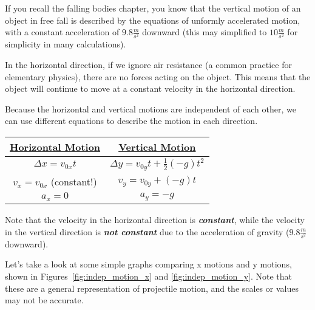 If you recall the falling bodies chapter, you know that the vertical motion of an object in free fall is described by the equations of unformly accelerated motion, with a constant acceleration of $9.8 \frac{m}{s^2}$ downward (this may simplified to $10 \frac{m}{s^2}$ for simplicity in many calculations).

In the horizontal direction, if we ignore air resistance (a common practice for elementary physics), there are no forces acting on the object. This means that the object will continue to move at a constant velocity in the horizontal direction.

Because the horizontal and vertical motions are independent of each other, we can use different equations to describe the motion in each direction.


\begin{center}
    \begin{table}[]
    \begin{tabular}{|c|c|}
        \underline{Horizontal Motion}       & \underline{Vertical Motion}  \\
        \hline
        $\Delta x = v_{0x} t$      & $\Delta y = v_{0y} t + \frac{1}{2} (-g) t^2$  \\
        $v_x = v_{0x}$ (constant!) & $v_y = v_{0y} + (-g) t$   \\
        $a_x = 0$                & $a_y = -g$ 
    \end{tabular}
    \end{table}
\end{center}

Note that the velocity in the horizontal direction is \emph{\textbf{constant}}, while the velocity in the vertical direction is \emph{\textbf{not constant}} due to the acceleration of gravity ($9.8 \frac{m}{s^2}$ downward).

Let's take a look at some simple graphs comparing x motions and y motions, shown in Figures~\ref{fig:indep_motion_x} and \ref{fig:indep_motion_y}. Note that these are a general representation of projectile motion, and the scales or values may not be accurate.

